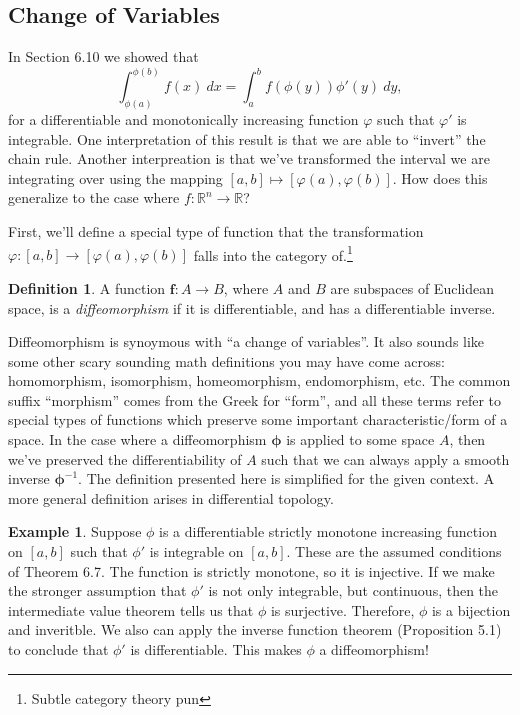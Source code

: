 \documentclass{article}
\newcommand{\R}{\mathbb{R}}
\newcommand{\f}{\mathbf{f}}
\theoremstyle{definition}
\newtheorem{definition}{Definition}[section]
\newtheorem{example}{Example}[section]
\begin{document}
	\subsection{Change of Variables}
	
	In Section 6.10 we showed that
	$$ \int_{\phi(a)}^{\phi(b)}f(x)\ dx=\int_{a}^{b}f(\phi(y))\phi'(y)\ dy,$$ for a differentiable and monotonically increasing function $\varphi$ such that $\varphi'$ is integrable. One interpretation of this result is that we are able to ``invert'' the chain rule. Another interpreation is that we've transformed the interval we are integrating over using the mapping $[a,b]\mapsto [\varphi(a),\varphi(b)]$. How does this generalize to the case where $f:\R^n \to \R$? 
	
	First, we'll define a special type of function that the transformation $\varphi:[a,b]\to [\varphi(a),\varphi(b)]$ falls into the category of.\footnote{Subtle category theory pun} 
	
	\begin{definition}\label{def10.9}
	A function $\f:A\to B$, where $A$ and $B$ are subspaces of Euclidean space, is a \textit{\color{red}diffeomorphism} if it is differentiable, and has a differentiable inverse.
	\end{definition}  
	
	Diffeomorphism is synoymous with ``a change of variables''. It also sounds like some other scary sounding math definitions you may have come across: homomorphism, isomorphism, homeomorphism, endomorphism, etc. The common suffix ``morphism'' comes from the Greek for ``form'', and all these terms refer to special types of functions which preserve some important characteristic/form of a space. In the case where a diffeomorphism $\boldsymbol{\phi}$ is applied to some space $A$, then we've preserved the differentiability of $A$ such that we can always apply a smooth inverse $\boldsymbol{\phi}^{-1}$. The definition presented here is simplified for the given context. A more general definition arises in differential topology. 
	
	\begin{example}
		Suppose $\phi$ is a differentiable strictly monotone increasing function on $[a,b]$ such that $\phi'$ is integrable on $[a,b]$. These are the assumed conditions of Theorem 6.7. The function is strictly monotone, so it is injective. If we make the stronger assumption that $\phi'$ is not only integrable, but continuous, then the intermediate value theorem tells us that $\phi$ is surjective. Therefore, $\phi$ is a bijection and inveritble. We also can apply the inverse function theorem (Proposition 5.1) to conclude that $\phi'$ is differentiable. This makes $\phi$ a diffeomorphism! 
	\end{example}
\end{document}
